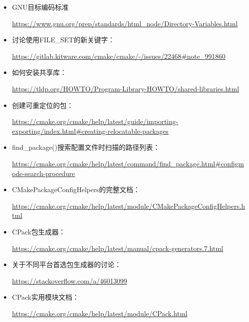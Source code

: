 

\begin{itemize}
\item
GNU目标编码标准

\url{https://www.gnu.org/prep/standards/html_node/Directory-Variables.html}

\item
讨论使用FILE\_SET的新关键字：

\url{https://gitlab.kitware.com/cmake/cmake/-/issues/22468#note_991860}

\item
如何安装共享库：

\url{https://tldp.org/HOWTO/Program-Library-HOWTO/shared-libraries.html}

\item
创建可重定位的包：

\url{https://cmake.org/cmake/help/latest/guide/importing-exporting/index.html#creating-relocatable-packages}

\item
find\_package()搜索配置文件时扫描的路径列表：

\url{https://cmake.org/cmake/help/latest/command/find_package.html#configmode-search-procedure}

\item
CMakePackageConfigHelpers的完整文档：

\url{https://cmake.org/cmake/help/latest/module/CMakePackageConfigHelpers.html}

\item
CPack包生成器：

\url{https://cmake.org/cmake/help/latest/manual/cpack-generators.7.html}

\item
关于不同平台首选包生成器的讨论：

\url{https://stackoverflow.com/a/46013099}

\item
CPack实用模块文档：

\url{https://cmake.org/cmake/help/latest/module/CPack.html}
\end{itemize}